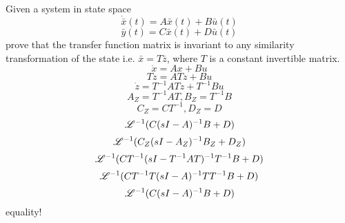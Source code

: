 \item Given a system in state space
  \begin{equation}
    \dot {\bar x}(t) = A\bar x(t) + B\bar u(t)
  \end{equation}
  \begin{equation}
    \bar y(t) = C\bar x(t) + D\bar u(t)
  \end{equation}
  prove that the transfer function matrix is invariant to any similarity transformation of the state i.e.
  $\bar x = T\bar z$, where $T$ is a constant invertible matrix.
  \begin{equation}
    \dot x = Ax + Bu
  \end{equation}
  \begin{equation}
    T\dot z = ATz + Bu
  \end{equation}
  \begin{equation}
    \dot z = T^{-1}ATz + T^{-1}Bu
  \end{equation}
  \begin{equation}
    A_Z = T^{-1}AT, B_Z = T^{-1}B
  \end{equation}
  \begin{equation}
    C_Z = CT^{-1}, D_Z = D
  \end{equation}
  \begin{equation}
    \mathscr{L}^{-1}(C(sI-A)^{-1}B + D)
  \end{equation}
  \begin{equation}
    \mathscr{L}^{-1}(C_Z(sI-A_Z)^{-1}B_Z + D_Z)
  \end{equation}
  \begin{equation}
    \mathscr{L}^{-1}(CT^{-1}(sI-T^{-1}AT)^{-1}T^{-1}B + D)
  \end{equation}
  \begin{equation}
    \mathscr{L}^{-1}(CT^{-1}T(sI-A)^{-1}TT^{-1}B + D)
  \end{equation}
  \begin{equation}
    \mathscr{L}^{-1}(C(sI-A)^{-1}B + D)
  \end{equation}
  equality!